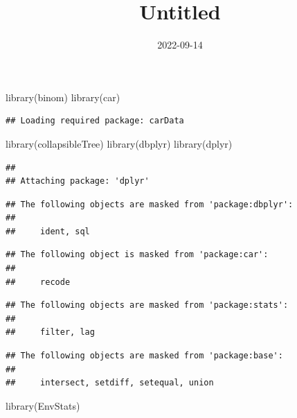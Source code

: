 \documentclass[
]{article}
\title{Untitled}
\author{}
\date{\vspace{-2.5em}2022-09-14}
\newenvironment{Shaded}{\begin{snugshade}}{\end{snugshade}}
\newcommand{\FunctionTok}[1]{\textcolor[rgb]{0.00,0.00,0.00}{#1}}
\newcommand{\NormalTok}[1]{#1}
\begin{document}
\maketitle

\begin{Shaded}
\begin{Highlighting}[]
\FunctionTok{library}\NormalTok{(binom)}
\FunctionTok{library}\NormalTok{(car)}
\end{Highlighting}
\end{Shaded}

\begin{verbatim}
## Loading required package: carData
\end{verbatim}

\begin{Shaded}
\begin{Highlighting}[]
\FunctionTok{library}\NormalTok{(collapsibleTree)}
\FunctionTok{library}\NormalTok{(dbplyr)}
\FunctionTok{library}\NormalTok{(dplyr)}
\end{Highlighting}
\end{Shaded}

\begin{verbatim}
## 
## Attaching package: 'dplyr'
\end{verbatim}

\begin{verbatim}
## The following objects are masked from 'package:dbplyr':
## 
##     ident, sql
\end{verbatim}

\begin{verbatim}
## The following object is masked from 'package:car':
## 
##     recode
\end{verbatim}

\begin{verbatim}
## The following objects are masked from 'package:stats':
## 
##     filter, lag
\end{verbatim}

\begin{verbatim}
## The following objects are masked from 'package:base':
## 
##     intersect, setdiff, setequal, union
\end{verbatim}

\begin{Shaded}
\begin{Highlighting}[]
\FunctionTok{library}\NormalTok{(EnvStats)}
\end{Highlighting}
\end{Shaded}
\end{document}
